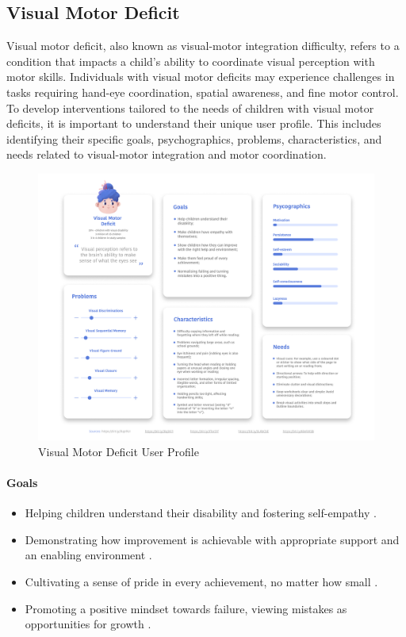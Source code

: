 \subsection{Visual Motor Deficit}
Visual motor deficit, also known as visual-motor integration difficulty, refers to a condition that impacts a child's ability to coordinate visual perception with motor skills. Individuals with visual motor deficits may experience challenges in tasks requiring hand-eye coordination, spatial awareness, and fine motor control. To develop interventions tailored to the needs of children with visual motor deficits, it is important to understand their unique user profile. This includes identifying their specific goals, psychographics, problems, characteristics, and needs related to visual-motor integration and motor coordination.

\begin{figure}[H]
    \centering
    \includegraphics[width=0.8\linewidth]{Chapters/figma/Visual Motor Deficit.png}
    \caption{Visual Motor Deficit User Profile}
    \label{fig:VMDUserProfile}
\end{figure}

\paragraph{Goals}
\begin{itemize}
    \item Helping children understand their disability and fostering self-empathy \cite{PorterAcademy}.
    \item Demonstrating how improvement is achievable with appropriate support and an enabling environment \cite{ScienceDaily}.
    \item Cultivating a sense of pride in every achievement, no matter how small \cite{ChildDevelopment}.
    \item Promoting a positive mindset towards failure, viewing mistakes as opportunities for growth \cite{Speechify}.
\end{itemize}

